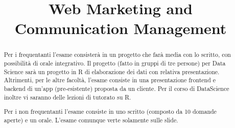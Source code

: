 \documentclass[11pt]{article}
\title{\textbf{Web Marketing and Communication Management}}
\author{}
\date{}
\begin{document}
\maketitle
\begin{abstract}
  Per i frequentanti l'esame consisterà in un progetto che farà media con lo scritto, con possibilità di orale integrativo.
  Il progetto (fatto in gruppi di tre persone) per Data Science sarà un progetto in R di elaborazione dei dati con relativa presentazione.
  Altrimenti, per le altre facoltà, l'esame consiste in una presentazione frontend e backend di un'app (pre-esistente) proposta da un cliente.
  Per il corso di DataScience inoltre vi saranno delle lezioni di tutorato su R.
  
  Per i non frequentanti l'esame consiste in uno scritto (composto da 10 domande aperte) e un orale.
  L'esame comunque verte solamente sulle slide.
\end{abstract}
\end{document}
